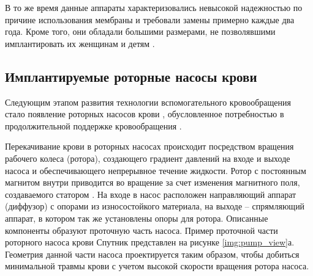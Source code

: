 В то же время данные аппараты характеризовались невысокой надежностью по причине использования мембраны и требовали замены примерно каждые два года. Кроме того, они обладали большими размерами, не позволявшими имплантировать их женщинам и детям \cite{frazier2017invited}. 

\subsection*{Имплантируемые роторные насосы крови} \label{chapt1_irbps}

Следующим этапом развития технологии вспомогательного кровообращения стало появление роторных насосов крови \cite{reul2000blood, daners2017left}, обусловленное потребностью в продолжительной поддержке кровообращения \cite{frazier2017invited}.

Перекачивание крови в роторных насосах происходит посредством вращения рабочего колеса (ротора), создающего градиент давлений на входе и выходе насоса и обеспечивающего непрерывное течение жидкости. Ротор с постоянным магнитом внутри приводится во вращение за счет изменения магнитного поля, создаваемого статором \cite{nose1998design, mt2010n6_ru}. На входе в насос расположен направляющий аппарат (диффузор) с опорами из износостойкого материала, на выходе -- спрямляющий аппарат, в котором так же установлены опоры для ротора. Описанные компоненты образуют проточную часть насоса. Пример проточной части роторного насоса крови Спутник представлен на рисунке \ref{img:pump_view}а. Геометрия данной части насоса проектируется таким образом, чтобы добиться минимальной травмы крови с учетом высокой скорости вращения ротора насоса.



